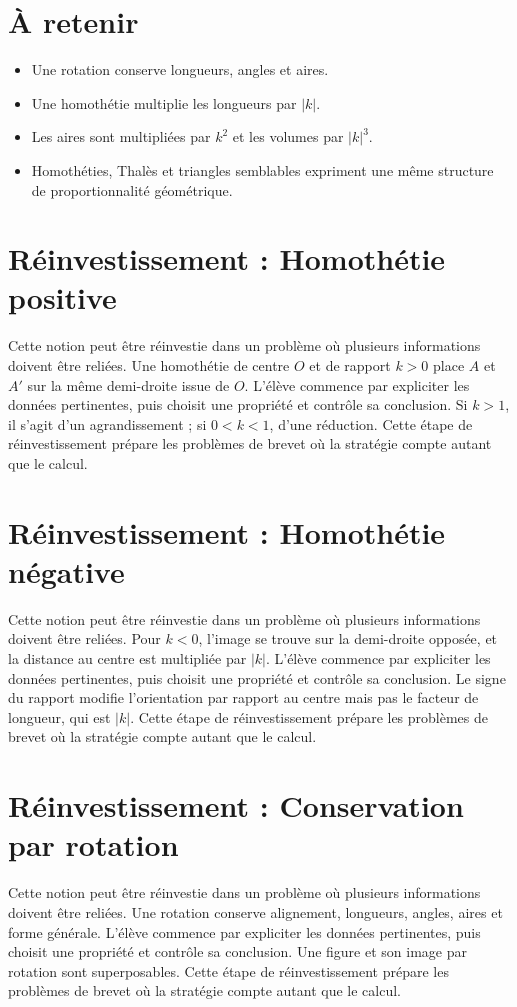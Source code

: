 \section{À retenir}
\begin{aretenir}
\begin{itemize}
\item Une rotation conserve longueurs, angles et aires.
\item Une homothétie multiplie les longueurs par $|k|$.
\item Les aires sont multipliées par $k^2$ et les volumes par $|k|^3$.
\item Homothéties, Thalès et triangles semblables expriment une même structure de proportionnalité géométrique.
\end{itemize}
\end{aretenir}

\section{Réinvestissement : Homothétie positive}
Cette notion peut être réinvestie dans un problème où plusieurs informations doivent être reliées. Une homothétie de centre $O$ et de rapport $k>0$ place $A$ et $A'$ sur la même demi-droite issue de $O$. L’élève commence par expliciter les données pertinentes, puis choisit une propriété et contrôle sa conclusion. Si $k>1$, il s’agit d’un agrandissement ; si $0<k<1$, d’une réduction. Cette étape de réinvestissement prépare les problèmes de brevet où la stratégie compte autant que le calcul.

\section{Réinvestissement : Homothétie négative}
Cette notion peut être réinvestie dans un problème où plusieurs informations doivent être reliées. Pour $k<0$, l’image se trouve sur la demi-droite opposée, et la distance au centre est multipliée par $|k|$. L’élève commence par expliciter les données pertinentes, puis choisit une propriété et contrôle sa conclusion. Le signe du rapport modifie l’orientation par rapport au centre mais pas le facteur de longueur, qui est $|k|$. Cette étape de réinvestissement prépare les problèmes de brevet où la stratégie compte autant que le calcul.

\section{Réinvestissement : Conservation par rotation}
Cette notion peut être réinvestie dans un problème où plusieurs informations doivent être reliées. Une rotation conserve alignement, longueurs, angles, aires et forme générale. L’élève commence par expliciter les données pertinentes, puis choisit une propriété et contrôle sa conclusion. Une figure et son image par rotation sont superposables. Cette étape de réinvestissement prépare les problèmes de brevet où la stratégie compte autant que le calcul.

